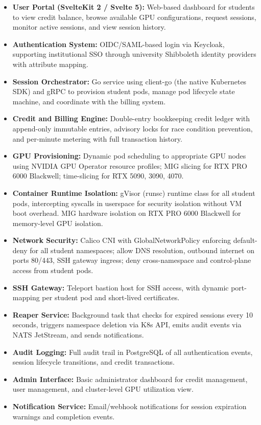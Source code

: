 \documentclass[12pt,a4paper]{article}
\begin{document}
\begin{itemize}[leftmargin=1.5em]
  \item \textbf{User Portal (SvelteKit 2 / Svelte 5):} Web-based dashboard for students to view credit balance, browse available GPU configurations, request sessions, monitor active sessions, and view session history.
  \item \textbf{Authentication System:} OIDC/SAML-based login via Keycloak, supporting institutional SSO through university Shibboleth identity providers with attribute mapping.
  \item \textbf{Session Orchestrator:} Go service using client-go (the native Kubernetes SDK) and gRPC to provision student pods, manage pod lifecycle state machine, and coordinate with the billing system.
  \item \textbf{Credit and Billing Engine:} Double-entry bookkeeping credit ledger with append-only immutable entries, advisory locks for race condition prevention, and per-minute metering with full transaction history.
  \item \textbf{GPU Provisioning:} Dynamic pod scheduling to appropriate GPU nodes using NVIDIA GPU Operator resource profiles; MIG slicing for RTX PRO 6000 Blackwell; time-slicing for RTX 5090, 3090, 4070.
  \item \textbf{Container Runtime Isolation:} gVisor (runsc) runtime class for all student pods, intercepting syscalls in userspace for security isolation without VM boot overhead. MIG hardware isolation on RTX PRO 6000 Blackwell for memory-level GPU isolation.
  \item \textbf{Network Security:} Calico CNI with GlobalNetworkPolicy enforcing default-deny for all student namespaces; allow DNS resolution, outbound internet on ports 80/443, SSH gateway ingress; deny cross-namespace and control-plane access from student pods.
  \item \textbf{SSH Gateway:} Teleport bastion host for SSH access, with dynamic port-mapping per student pod and short-lived certificates.
  \item \textbf{Reaper Service:} Background task that checks for expired sessions every 10 seconds, triggers namespace deletion via K8s API, emits audit events via NATS JetStream, and sends notifications.
  \item \textbf{Audit Logging:} Full audit trail in PostgreSQL of all authentication events, session lifecycle transitions, and credit transactions.
  \item \textbf{Admin Interface:} Basic administrator dashboard for credit management, user management, and cluster-level GPU utilization view.
  \item \textbf{Notification Service:} Email/webhook notifications for session expiration warnings and completion events.
\end{itemize}
\end{document}
